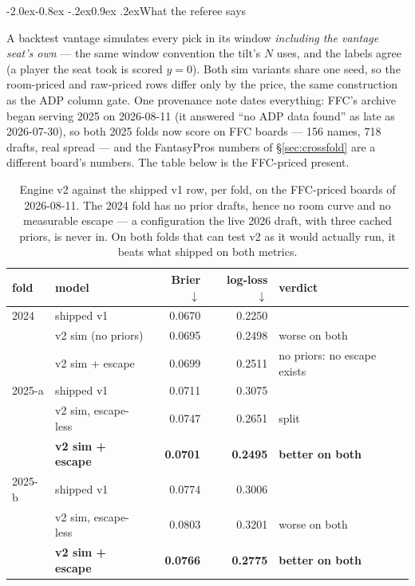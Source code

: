 \documentclass[10pt,a4paper]{article}
\makeatletter
\theoremstyle{plain}
\theoremstyle{definition}
\theoremstyle{remark}
\renewcommand\subsection{\@startsection{subsection}{2}{\z@}%
  {-2.0ex\@plus -0.8ex \@minus -.2ex}{0.9ex \@plus .2ex}{\normalfont\large\bfseries}}
\makeatother
\begin{document}
\subsection{What the referee says}

A backtest vantage simulates every pick in its window \emph{including the vantage seat's
own} --- the same window convention the tilt's $N$ uses, and the labels agree (a player the
seat took is scored $y=0$). Both sim variants share one seed, so the room-priced and
raw-priced rows differ only by the price, the same construction as the ADP column gate.
One provenance note dates everything: FFC's archive began serving 2025 on 2026-08-11
(it answered ``no ADP data found'' as late as 2026-07-30), so both 2025 folds now score on
FFC boards --- 156 names, 718 drafts, real spread --- and the FantasyPros numbers of
\S\ref{sec:crossfold} are a different board's numbers. The table below is the FFC-priced
present.

\begin{table}[htbp]
\centering
\small
\begin{tabular}{llrrl}
\toprule
fold & model & Brier $\downarrow$ & log-loss $\downarrow$ & verdict \\
\midrule
2024   & shipped v1                  & 0.0670 & 0.2250 & \\
       & v2 sim (no priors)          & 0.0695 & 0.2498 & worse on both \\
       & v2 sim + escape             & 0.0699 & 0.2511 & no priors: no escape exists \\
\midrule
2025-a & shipped v1                  & 0.0711 & 0.3075 & \\
       & v2 sim, escape-less         & 0.0747 & 0.2651 & split \\
       & \textbf{v2 sim + escape}    & \textbf{0.0701} & \textbf{0.2495} & \textbf{better on both} \\
\midrule
2025-b & shipped v1                  & 0.0774 & 0.3006 & \\
       & v2 sim, escape-less         & 0.0803 & 0.3201 & worse on both \\
       & \textbf{v2 sim + escape}    & \textbf{0.0766} & \textbf{0.2775} & \textbf{better on both} \\
\bottomrule
\end{tabular}
\caption{Engine v2 against the shipped v1 row, per fold, on the FFC-priced boards of
2026-08-11. The 2024 fold has no prior drafts, hence no room curve and no measurable
escape --- a configuration the live 2026 draft, with three cached priors, is never in. On
both folds that can test v2 as it would actually run, it beats what shipped on both
metrics.}
\label{tab:sim}
\end{table}
\end{document}
